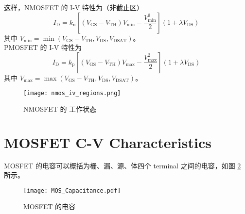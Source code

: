 这样，NMOSFET 的 I-V 特性为（非截止区）
\begin{equation}
    I_{\mathrm{D}} = k_{\mathrm{n}} \left[ (V_{\mathrm{GS}} - V_{\mathrm{TH}}) V_{\mathrm{min}} - \frac{V_{\mathrm{min}}^2}{2} \right] \left(1 + \lambda V_{\mathrm{DS}}\right)
\end{equation}
其中 $V_{\mathrm{min}} = \min \left(V_{\mathrm{GS}} - V_{\mathrm{TH}}, V_{\mathrm{DS}}, V_{\mathrm{DSAT}}\right)$。\\
PMOSFET 的 I-V 特性为
\begin{equation}
    I_{\mathrm{D}} = k_{\mathrm{p}} \left[ (V_{\mathrm{GS}} - V_{\mathrm{TH}}) V_{\mathrm{max}} - \frac{V_{\mathrm{max}}^2}{2} \right] \left(1 + \lambda V_{\mathrm{DS}}\right)
\end{equation}
其中 $V_{\mathrm{max}} = \max \left(V_{\mathrm{GS}} - V_{\mathrm{TH}}, V_{\mathrm{DS}}, V_{\mathrm{DSAT}}\right)$。

\begin{figure}[!hbt]
    \centering
    \texttt{[image: nmos\_iv\_regions.png]}
    \caption{NMOSFET 的 工作状态}
    \label{fig:nmos_iv_regions}
\end{figure}

\section{MOSFET C-V Characteristics}

MOSFET 的电容可以概括为栅、漏、源、体四个 terminal 之间的电容，如图 \ref{fig:mosfet_capacitance} 所示。

\begin{figure}[!htb]
    \centering
    \texttt{[image: MOS\_Capacitance.pdf]}
    \caption{MOSFET 的电容\cite{CMOS-VLSI}}
    \label{fig:mosfet_capacitance}
\end{figure}

